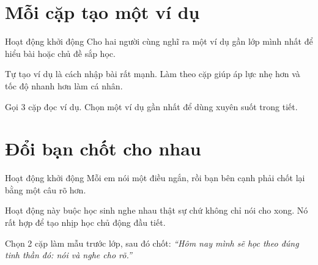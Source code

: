 \section{Mỗi cặp tạo một ví dụ}
\begin{khoidongbox}{Hoạt động khởi động}
Cho hai người cùng nghĩ ra một ví dụ gần lớp mình nhất để hiểu bài hoặc chủ đề sắp học.
\end{khoidongbox}
\begin{visaohieuqua}
Tự tạo ví dụ là cách nhập bài rất mạnh. Làm theo cặp giúp áp lực nhẹ hơn và tốc độ nhanh hơn làm cá nhân.
\end{visaohieuqua}
\begin{cachlam5phut}
Gọi 3 cặp đọc ví dụ. Chọn một ví dụ gần nhất để dùng xuyên suốt trong tiết.
\end{cachlam5phut}
\ngancach

\section{Đổi bạn chốt cho nhau}
\begin{khoidongbox}{Hoạt động khởi động}
Mỗi em nói một điều ngắn, rồi bạn bên cạnh phải chốt lại bằng một câu rõ hơn.
\end{khoidongbox}
\begin{visaohieuqua}
Hoạt động này buộc học sinh nghe nhau thật sự chứ không chỉ nói cho xong. Nó rất hợp để tạo nhịp học chủ động đầu tiết.
\end{visaohieuqua}
\begin{cachlam5phut}
Chọn 2 cặp làm mẫu trước lớp, sau đó chốt: \textit{``Hôm nay mình sẽ học theo đúng tinh thần đó: nói và nghe cho rõ.''}
\end{cachlam5phut}